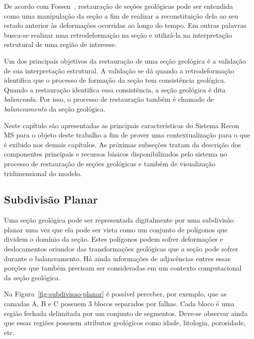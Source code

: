 De acordo com Fossen~\cite{Fossen}, restauração de seções geológicas pode ser entendida como uma manipulação da seção a fim de realizar a reconstituição dela ao seu estado anterior às deformações ocorridas ao longo do tempo. Em outras palavras busca-se realizar uma retrodeformação na seção e utilizá-la na interpretação estrutural de uma região de interesse.

Um dos principais objetivos da restauração de uma seção geológica é a validação de sua interpretação estrutural. A validação se dá quando a retrodeformação identifica que o processo de formação da seção tem consistência geológica. Quando a restauração identifica essa consistência, a seção geológica é dita \emph{balanceada}. Por isso, o processo de restauração também é chamado de \emph{balanceamento} da seção geológica.

Neste capítulo são apresentadas as principais características do Sistema Recon MS para o objeto deste trabalho a fim de prover uma contextualização para o que é exibido nos demais capítulos. As próximas subseções tratam da descrição dos componentes principais e recursos básicos disponibilizados pelo sistema no processo de restauração de seções geológicas e também de visualização tridimensional do modelo. 

\subsection{Subdivisão Planar} %

Uma seção geológica pode ser representada digitalmente por uma subdivisão planar uma vez que ela pode ser vista como um conjunto de polígonos que dividem o domínio da seção. Estes polígonos podem sofrer deformações e deslocamentos oriundos das transformações geológicas que a seção pode sofrer durante o balanceamento. Há ainda informações de adjacências entres essas porções que também precisam ser consideradas em um contexto computacional da seção geológica.

Na Figura~\ref{fig-subdivisao-planar} é possível perceber, por exemplo, que as camadas A, B e C possuem 3 blocos separados por falhas. Cada bloco é uma região fechada delimitada por um conjunto de segmentos. Deve-se observar ainda que essas regiões possuem atributos geológicos como idade, litologia, porosidade, etc.

